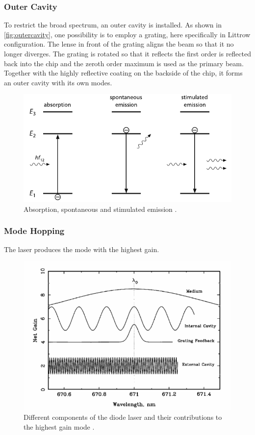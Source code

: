\subsubsection{Outer Cavity}
To restrict the broad spectrum, an outer cavity is installed.
As shown in \autoref{fig:outercavity}, one possibility is to employ a grating, here specifically in Littrow configuration.
The lense in front of the grating aligns the beam so that it no longer diverges.
The grating is rotated so that it reflects the first order is reflected back into the chip and the zeroth order maximum is used as the primary beam.
Together with the highly reflective coating on the backside of the chip, it forms an outer cavity with its own modes.

\begin{figure}[H]
    \centering
    \includegraphics{figures/emission.pdf}
    \caption{Absorption, spontaneous and stimulated emission \cite{teachspin}.}
    \label{fig:outercavity}
\end{figure}

\subsubsection{Mode Hopping}

The laser produces the mode with the highest gain.

\begin{figure}[H]
    \centering
    \includegraphics{figures/gain.pdf}
    \caption{Different components of the diode laser and their contributions to the highest gain mode \cite{teachspin}.}
    \label{fig:gain}
\end{figure}

